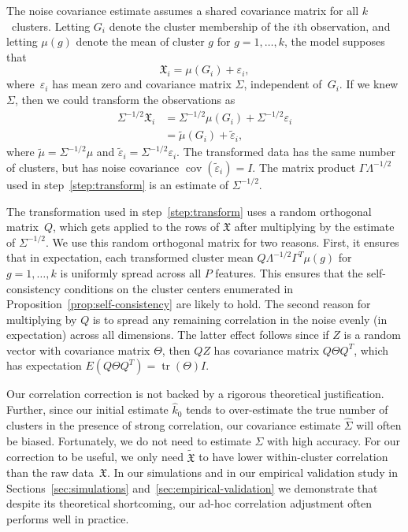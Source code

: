 \documentclass[12pt]{article}
\DeclareMathOperator*{\cov}{cov}
\DeclareMathOperator*{\tr}{tr}
\newcommand{\T}{T}
\newcommand{\dataX}{\mathfrak{X}}
\begin{document}
The noise covariance estimate assumes a shared covariance matrix for all
$k$~clusters. Letting $G_i$ denote the cluster membership of the $i$th
observation, and letting $\mu(g)$ denote the mean of cluster $g$ for $g = 1,
\dotsc, k$, the model supposes that
\[
  \dataX_i = \mu(G_i)+\varepsilon_i,
\]
where~$\varepsilon_i$ has mean zero and covariance matrix $\Sigma$, independent
of~$G_i$. If we knew $\Sigma$, then we could transform the observations as
\begin{align*}
  \Sigma^{-1/2} \dataX_i
    &= \Sigma^{-1/2} \mu(G_i) + \Sigma^{-1/2} \varepsilon_i \\
    &= \tilde \mu(G_i) + \tilde \varepsilon_i,
\end{align*}
where $\tilde \mu = \Sigma^{-1/2} \mu$ and
$\tilde \varepsilon_i = \Sigma^{-1/2} \varepsilon_i$. The transformed data
has the same number of clusters, but has noise covariance
$\cov(\tilde \varepsilon_i) = I$. The matrix product $\Gamma \Lambda^{-1/2}$
used in step~\ref{step:transform} is an estimate of $\Sigma^{-1/2}$.


The transformation used in step~\ref{step:transform} uses a random orthogonal
matrix~$Q$, which gets applied to the rows of $\dataX$ after 
multiplying by the estimate of $\Sigma^{-1/2}$. We use this random orthogonal
matrix for two reasons. First, it ensures that in expectation, each transformed cluster mean
$Q \Lambda^{-1/2} \Gamma^\T \mu(g)$ for $g = 1, \dotsc, k$ is uniformly
spread across all $P$ features. This ensures that the self-consistency
conditions on the cluster centers enumerated in Proposition~\ref{prop:self-consistency}
are likely to hold. The second reason for multiplying by $Q$ is to spread any
remaining correlation in the noise evenly (in expectation) across all
dimensions. The latter effect follows since if $Z$ is a random vector with
covariance matrix $\Theta$, then $Q Z$ has covariance matrix $Q \Theta Q^\T$,
which has expectation $E(Q \Theta Q^\T) = \tr(\Theta) I$.


Our correlation correction is not backed by a rigorous theoretical
justification. Further, since our initial estimate $\hat k_0$ tends to
over-estimate the true number of clusters in the presence of strong
correlation, our covariance estimate $\hat \Sigma$ will often be biased.
Fortunately, we do not need to estimate $\Sigma$ with high accuracy. For our
correction to be useful, we only need $\tilde{\dataX}$ to have lower
within-cluster correlation than the raw data~$\dataX$. In our simulations and
in our empirical validation study in Sections~\ref{sec:simulations}
and~\ref{sec:empirical-validation} we demonstrate that despite its theoretical
shortcoming, our ad-hoc correlation adjustment often performs well in
practice.
\end{document}
